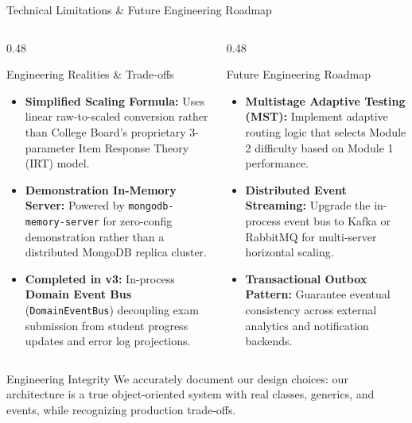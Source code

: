﻿\documentclass[aspectratio=169,10pt,t]{beamer}
\begin{document}
\begin{frame}{Technical Limitations \& Future Engineering Roadmap}
  \vspace{0.5mm}
  \begin{columns}[T]
    \begin{column}{0.48\textwidth}
      \begin{infoCard}{Engineering Realities \& Trade-offs}
        \begin{itemize}\setlength{\itemsep}{1.2pt}\setlength{\parskip}{0pt}\setlength{\leftmargini}{8pt}
          \item \textbf{Simplified Scaling Formula:} Uses linear raw-to-scaled conversion rather than College Board's proprietary 3-parameter Item Response Theory (IRT) model.
          \item \textbf{Demonstration In-Memory Server:} Powered by \texttt{mongodb-memory-server} for zero-config demonstration rather than a distributed MongoDB replica cluster.
          \item \textbf{Completed in v3:} In-process \textbf{Domain Event Bus} (\texttt{DomainEventBus}) decoupling exam submission from student progress updates and error log projections.
        \end{itemize}
      \end{infoCard}
    \end{column}

    \begin{column}{0.48\textwidth}
      \begin{infoCard}{Future Engineering Roadmap}
        \begin{itemize}\setlength{\itemsep}{1.2pt}\setlength{\parskip}{0pt}\setlength{\leftmargini}{8pt}
          \item \textbf{Multistage Adaptive Testing (MST):} Implement adaptive routing logic that selects Module 2 difficulty based on Module 1 performance.
          \item \textbf{Distributed Event Streaming:} Upgrade the in-process event bus to Kafka or RabbitMQ for multi-server horizontal scaling.
          \item \textbf{Transactional Outbox Pattern:} Guarantee eventual consistency across external analytics and notification backends.
        \end{itemize}
      \end{infoCard}
    \end{column}
  \end{columns}

  \vspace{1.2mm}
  \begin{hlCard}{Engineering Integrity}
    We accurately document our design choices: our architecture is a true object-oriented system with real classes, generics, and events, while recognizing production trade-offs.
  \end{hlCard}
\end{frame}
\end{document}
